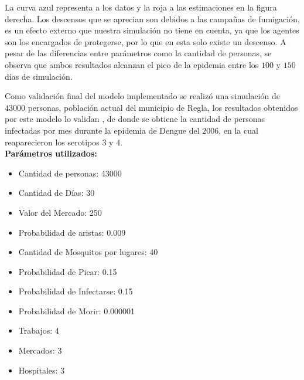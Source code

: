 La curva azul representa a los datos y la roja a las estimaciones en la figura derecha. 
Los descensos que se aprecian son debidos a las campañas de fumigación,
es un efecto externo que nuestra simulación no tiene en cuenta, ya que los agentes son los encargados
de protegerse, por lo que en esta solo existe un descenso. A pesar de las diferencias entre parámetros
como la cantidad de personas, se observa que ambos resultados alcanzan el pico de la epidemia entre los 
$100$ y $150$ días de simulación.

Como validación final del modelo implementado se realizó una simulación de $43000$ personas, población
actual del municipio de Regla, los resultados obtenidos por este modelo lo validan \autocite{Massón2015},
de donde se obtiene la cantidad de personas infectadas por mes durante la epidemia de Dengue del $2006$, en la 
cual reaparecieron los serotipos $3$ y $4$.\\

\textbf{Parámetros utilizados:}
\begin{itemize}
    \item Cantidad de personas: 43000
    \item Cantidad de Días: 30
    \item Valor del Mercado: 250
    \item Probabilidad de aristas: 0.009
    \item Cantidad de Mosquitos por lugares: 40
    \item Probabilidad de Picar: 0.15
    \item Probabilidad de Infectarse: 0.15
    \item Probabilidad de Morir: 0.000001
    \item Trabajos: 4
    \item Mercados: 3
    \item Hospitales: 3
\end{itemize}


